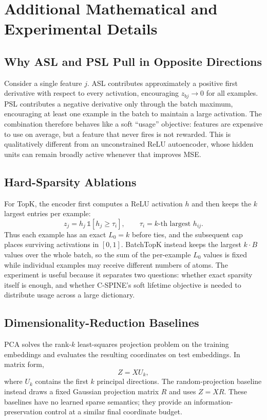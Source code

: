 \documentclass[conference]{IEEEtran}
\begin{document}
\appendices

\section{Additional Mathematical and Experimental Details}
\subsection{Why ASL and PSL Pull in Opposite Directions}
Consider a single feature $j$. ASL contributes approximately a positive
first derivative with respect to every activation, encouraging
$z_{bj}\rightarrow 0$ for all examples. PSL contributes a negative
derivative only through the batch maximum, encouraging at least one
example in the batch to maintain a large activation. The combination
therefore behaves like a soft ``usage'' objective: features are expensive
to use on average, but a feature that never fires is not rewarded. This is
qualitatively different from an unconstrained ReLU autoencoder, whose
hidden units can remain broadly active whenever that improves MSE.

\subsection{Hard-Sparsity Ablations}
For TopK, the encoder first computes a ReLU activation $h$ and then keeps
the $k$ largest entries per example:
\begin{equation}
z_j = h_j\,\mathbb{1}[h_j \ge \tau_i], \qquad \tau_i = \text{$k$-th largest } h_{ij}.
\end{equation}
Thus each example has an exact $L_0=k$ before ties, and the subsequent cap
places surviving activations in $[0,1]$. BatchTopK instead keeps the
largest $k\cdot B$ values over the whole batch, so the sum of the
per-example $L_0$ values is fixed while individual examples may receive
different numbers of atoms. The experiment is useful because it separates
two questions: whether exact sparsity itself is enough, and whether
C-SPINE's soft lifetime objective is needed to distribute usage across a
large dictionary.

\subsection{Dimensionality-Reduction Baselines}
PCA solves the rank-$k$ least-squares projection problem on the training
embeddings and evaluates the resulting coordinates on test embeddings. In
matrix form,
\begin{equation}
Z = X U_k,
\end{equation}
where $U_k$ contains the first $k$ principal directions. The
random-projection baseline instead draws a fixed Gaussian projection matrix
$R$ and uses $Z=XR$. These baselines have no learned sparse semantics; they
provide an information-preservation control at a similar final coordinate
budget.
\end{document}
